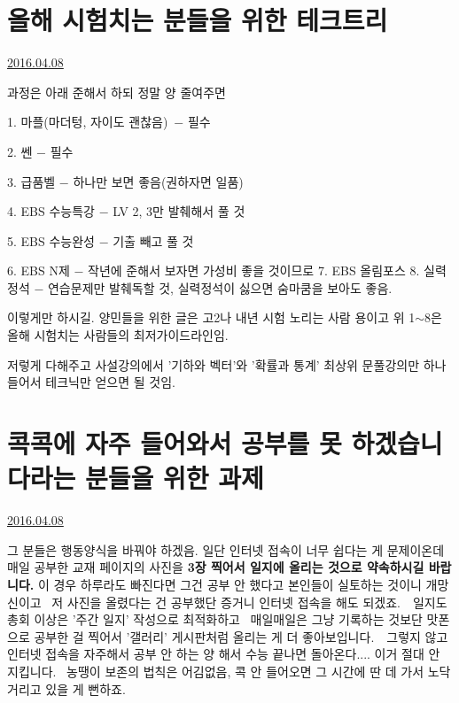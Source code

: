\section{올해 시험치는 분들을 위한 테크트리}
\href{https://www.kockoc.com/Apoc/719082}{2016.04.08}

\vspace{5mm}

과정은 아래 준해서 하되 정말 양 줄여주면
\vspace{5mm}

\item 1. 마플(마더텅, 자이도 괜찮음) $-$ 필수
\item 2. 쎈 $-$ 필수
\item 3. 급품벨 $-$ 하나만 보면 좋음(권하자면 일품)
\item 4. EBS 수능특강 $-$ LV 2, 3만 발췌해서 풀 것
\item 5. EBS 수능완성 $-$ 기출 빼고 풀 것
\item 6. EBS N제 $-$ 작년에 준해서 보자면 가성비 좋을 것이므로
7. EBS 올림포스
8. 실력정석 $-$ 연습문제만 발췌독할 것, 실력정석이 싫으면 숨마쿰을 보아도 좋음.
\vspace{5mm}

이렇게만 하시길.
양민들을 위한 글은 고2나 내년 시험 노리는 사람 용이고
위 1$\sim$8은 올해 시험치는 사람들의 최저가이드라인임.
\vspace{5mm}

저렇게 다해주고 사설강의에서 '기하와 벡터'와 '확률과 통계' 최상위 문풀강의만 하나 들어서 테크닉만 얻으면 될 것임.
\vspace{5mm}






\section{콕콕에 자주 들어와서 공부를 못 하겠습니다라는 분들을 위한 과제}
\href{https://www.kockoc.com/Apoc/719106}{2016.04.08}

\vspace{5mm}

그 분들은 행동양식을 바꿔야 하겠음.
일단 인터넷 접속이 너무 쉽다는 게 문제이온데
매일 공부한 교재 페이지의 사진을 \textbf{3장 찍어서 일지에 올리는 것으로 약속하시길 바랍니다.}
이 경우 하루라도 빠진다면 그건 공부 안 했다고 본인들이 실토하는 것이니 개망신이고  저 사진을 올렸다는 건 공부했단 증거니 인터넷 접속을 해도 되겠죠.  일지도 총회 이상은 '주간 일지' 작성으로 최적화하고  매일매일은 그냥 기록하는 것보단 맛폰으로 공부한 걸 찍어서 '갤러리' 게시판처럼 올리는 게 더 좋아보입니다.  그렇지 않고 인터넷 접속을 자주해서 공부 안 하는 양 해서 수능 끝나면 돌아온다.... 이거 절대 안 지킵니다.  농땡이 보존의 법칙은 어김없음, 콕 안 들어오면 그 시간에 딴 데 가서 노닥거리고 있을 게 뻔하죠.









